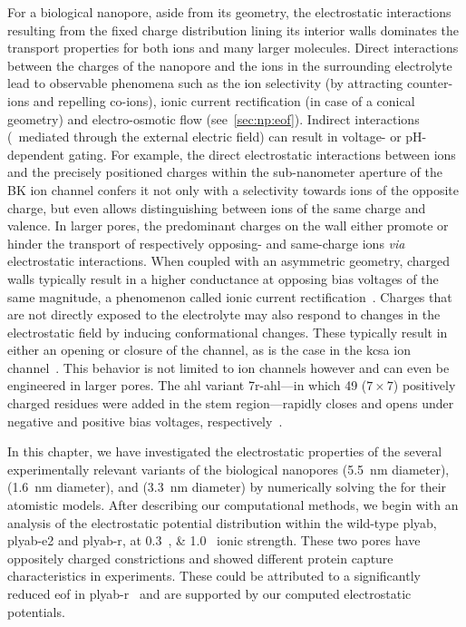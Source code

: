 For a biological nanopore, aside from its geometry, the electrostatic interactions resulting from the fixed
charge distribution lining its interior walls dominates the transport properties for both ions and many larger
molecules. Direct interactions between the charges of the nanopore and the ions in the surrounding electrolyte
lead to observable phenomena such as the ion selectivity (by attracting counter-ions and repelling co-ions),
ionic current rectification (in case of a conical geometry) and electro-osmotic flow (see~\cref{sec:np:eof}).
Indirect interactions (\ie~mediated through the external electric field) can result in voltage- or
pH-dependent gating. For example, the direct electrostatic interactions between ions and the precisely
positioned charges within the sub-nanometer aperture of the BK ion channel confers it not only with a
selectivity towards ions of the opposite charge, but even allows distinguishing between ions of the same
charge and valence. In larger pores, the predominant charges on the wall either promote or hinder the
transport of respectively opposing- and same-charge ions \textit{via} electrostatic interactions. When coupled
with an asymmetric geometry, charged walls typically result in a higher conductance at opposing bias voltages
of the same magnitude, a phenomenon called ionic current
rectification~\cite{White-2008,Lin-2015,Hsu-2017b,Valisko-2019}. Charges that are not directly exposed to the
electrolyte may also respond to changes in the electrostatic field by inducing conformational changes. These
typically result in either an opening or closure of the channel, as is the case in the \gls{kcsa} ion
channel~\cite{Kopec-2019}. This behavior is not limited to ion channels however and can even be engineered in
larger pores. The \gls{ahl} variant \gls{7r-ahl}---in which 49 ($7\times7$) positively charged residues were
added in the stem region---rapidly closes and opens under negative and positive bias voltages,
respectively~\cite{Maglia-2009}.

In this chapter, we have investigated the electrostatic properties of the several experimentally relevant
variants of the biological nanopores  (\SI{5.5}{\nm} diameter),  (\SI{1.6}{\nm}
diameter), and  (\SI{3.3}{\nm} diameter) by numerically solving the  for their
atomistic models. After describing our computational methods, we begin with an analysis of the electrostatic
potential distribution within the wild-type \gls{plyab}, \gls{plyab-e2} and \gls{plyab-r}, at
\SIlist{0.3;1.0}{\Molar} ionic strength. These two pores have oppositely charged constrictions and showed
different protein capture characteristics in experiments. These could be attributed to a significantly reduced
\gls{eof} in \gls{plyab-r}~\cite{Huang-2020} and are supported by our computed electrostatic potentials.

